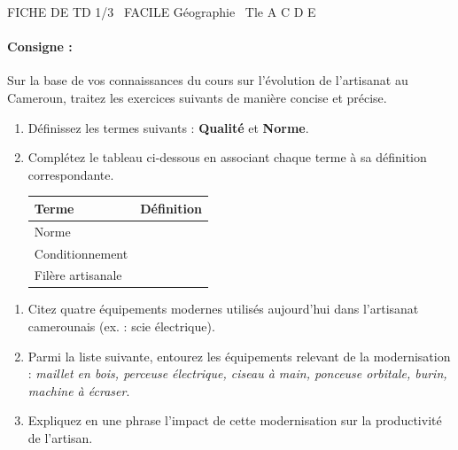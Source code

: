 \documentclass[11pt]{article}
\begin{document}
\begin{tcolorbox}[enhanced,colback=popink,colframe=popink,arc=10pt,boxrule=0pt,left=12pt,right=12pt,top=9pt,bottom=9pt]
{\color{white}\popxbold\small FICHE DE TD 1/3 \textbullet\ FACILE \hfill Géographie \textbullet\ Tle A C D E\par}
\end{tcolorbox}
\vspace{4pt}
\paragraph{Consigne :} Sur la base de vos connaissances du cours sur l'évolution de l'artisanat au Cameroun, traitez les exercices suivants de manière concise et précise.

\begin{exercice}
\begin{enumerate}
    \item Définissez les termes suivants : \textbf{Qualité} et \textbf{Norme}.
    \item Complétez le tableau ci-dessous en associant chaque terme à sa définition correspondante.
    
    \begin{tabular}{|p{3.5cm}|p{11cm}|}
    \hline
    \textbf{Terme} & \textbf{Définition} \\
    \hline
    Norme &  \\
    \hline
    Conditionnement &  \\
    \hline
    Filère artisanale &  \\
    \hline
    \end{tabular}
\end{enumerate}
\end{exercice}

\begin{exercice}
\begin{enumerate}
    \item Citez quatre équipements modernes utilisés aujourd'hui dans l'artisanat camerounais (ex. : scie électrique).
    \item Parmi la liste suivante, entourez les équipements relevant de la modernisation : \textit{maillet en bois, perceuse électrique, ciseau à main, ponceuse orbitale, burin, machine à écraser}.
    \item Expliquez en une phrase l'impact de cette modernisation sur la productivité de l'artisan.
\end{enumerate}
\end{exercice}
\end{document}
